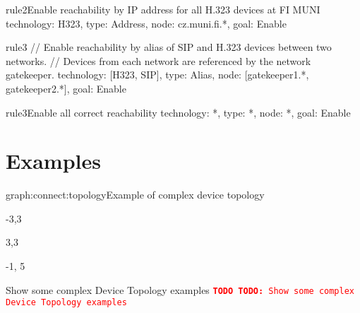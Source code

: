 \documentclass[a4paper]{report}
\newcommand{\TODO}[1]{%
\def\empty{}%
\def\prvniparametr{#1}%
\ifx\prvniparametr\empty%
\begingroup\tt\textcolor{red}{\noindent\textbf{TODO}}\endgroup
\else%
\begingroup\tt\textcolor{red}{\noindent\textbf{TODO:}\ #1}\endgroup
\fi%
}
\begin{document}
\begin{TopologyExample}{rule2}{Enable reachability by IP address for all H.323 devices at FI MUNI}
technology: H323,
type: Address,
node: cz.muni.fi.*,
goal: Enable
\end{TopologyExample}

\begin{TopologyExample}{rule3}{}
// Enable reachability by alias of SIP and H.323 devices between two networks.
// Devices from each network are referenced by the network gatekeeper.
technology: [H323, SIP],
type: Alias,
node: [gatekeeper1.*, gatekeeper2.*],
goal: Enable
\end{TopologyExample}

\begin{TopologyExample}{rule3}{Enable all correct reachability}
technology: *,
type: *,
node: *,
goal: Enable
\end{TopologyExample}


\section{Examples}

\begin{Graph}{graph:connect:topology}{Example of complex device topology}  
  \begin{SubGraph}{-3,3}{}
  \end{SubGraph}
  
  \begin{SubGraph}{3,3}{}
  \end{SubGraph}

  
  \begin{GraphLegend}{-1, 5}
  \end{GraphLegend}
\end{Graph}

\TODO{Show some complex Device Topology examples}
\end{document}
